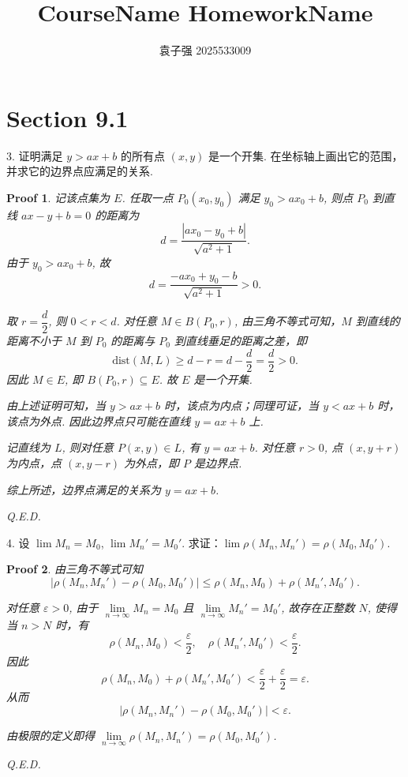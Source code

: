\documentclass[a4paper,12pt]{article}
\title{CourseName HomeworkName}
\author{袁子强\hspace{1cm} 2025533009}
\newtheorem*{pf}{Proof}
\begin{document}
\maketitle

\section*{Section 9.1}

3. 证明满足 $y > ax + b$ 的所有点 $(x,y)$ 是一个开集. 在坐标轴上画出它的范围，并求它的边界点应满足的关系.

\begin{pf}
    记该点集为 $E$. 任取一点 $P_0(x_0, y_0)$ 满足 $y_0 > ax_0 + b$, 则点 $P_0$ 到直线 $ax - y + b = 0$ 的距离为
    $$
        d = \frac{|ax_0 - y_0 + b|}{\sqrt{a^2 + 1}}.
    $$
    由于 $y_0 > ax_0 + b$, 故
    $$
        d = \frac{-ax_0 + y_0 - b}{\sqrt{a^2 + 1}} > 0.
    $$

    取 $r = \dfrac{d}{2}$, 则 $0 < r < d$. 对任意 $M \in B(P_0, r)$, 由三角不等式可知，$M$ 到直线的距离不小于 $M$ 到 $P_0$ 的距离与 $P_0$ 到直线垂足的距离之差，即
    $$
        \text{dist}(M, L) \geq d - r = d - \frac{d}{2} = \frac{d}{2} > 0.
    $$
    因此 $M \in E$, 即 $B(P_0, r) \subseteq E$. 故 $E$ 是一个开集.

    由上述证明可知，当 $y > ax + b$ 时，该点为内点；同理可证，当 $y < ax + b$ 时，该点为外点. 因此边界点只可能在直线 $y = ax + b$ 上.

    记直线为 $L$, 则对任意 $P(x, y) \in L$, 有 $y = ax + b$. 对任意 $r > 0$, 点 $(x, y + r)$ 为内点，点 $(x, y - r)$ 为外点，即 $P$ 是边界点.

    综上所述，边界点满足的关系为 $y = ax + b$.

    Q.E.D.
\end{pf}

4. 设 $\lim M_n = M_0$, $\lim M_n' = M_0'$. 求证：$\lim \rho(M_n, M_n') = \rho(M_0, M_0')$.

\begin{pf}
    由三角不等式可知
    $$
        |\rho(M_n, M_n') - \rho(M_0, M_0')| \leq \rho(M_n, M_0) + \rho(M_n', M_0').
    $$

    对任意 $\varepsilon > 0$, 由于 $\lim\limits_{n \to \infty} M_n = M_0$ 且 $\lim\limits_{n \to \infty} M_n' = M_0'$, 故存在正整数 $N$, 使得当 $n > N$ 时，有
    $$
        \rho(M_n, M_0) < \frac{\varepsilon}{2}, \quad \rho(M_n', M_0') < \frac{\varepsilon}{2}.
    $$
    因此
    $$
        \rho(M_n, M_0) + \rho(M_n', M_0') < \frac{\varepsilon}{2} + \frac{\varepsilon}{2} = \varepsilon.
    $$
    从而
    $$
        |\rho(M_n, M_n') - \rho(M_0, M_0')| < \varepsilon.
    $$

    由极限的定义即得 $\lim\limits_{n \to \infty} \rho(M_n, M_n') = \rho(M_0, M_0')$.

    Q.E.D.
\end{pf}
\end{document}
